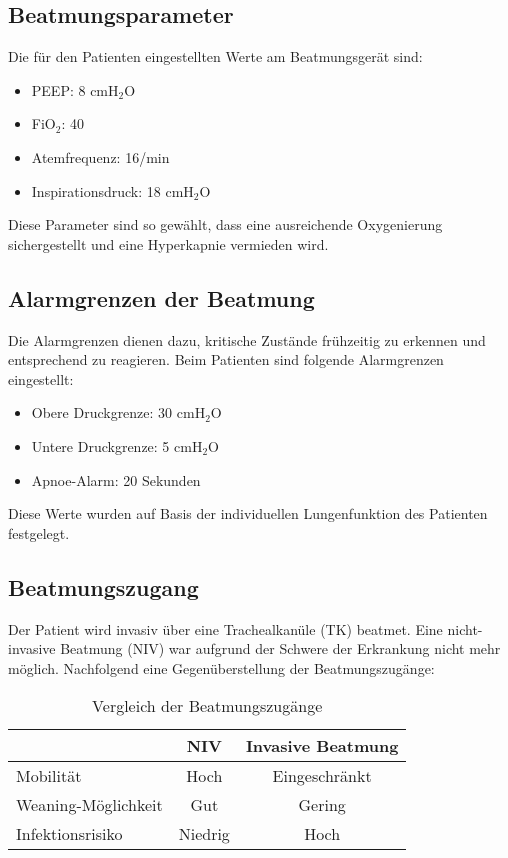 \documentclass[a4paper,12pt]{article}
\begin{document}
\subsection{Beatmungsparameter}
Die für den Patienten eingestellten Werte am Beatmungsgerät sind:
\begin{itemize}
	\item PEEP: 8 cmH$_2$O
	\item FiO$_2$: 40%
	\item Atemfrequenz: 16/min
	\item Inspirationsdruck: 18 cmH$_2$O
\end{itemize}
Diese Parameter sind so gewählt, dass eine ausreichende Oxygenierung sichergestellt
und eine Hyperkapnie vermieden wird.

\subsection{Alarmgrenzen der Beatmung}
Die Alarmgrenzen dienen dazu, kritische Zustände frühzeitig zu erkennen und
entsprechend zu reagieren. Beim Patienten sind folgende Alarmgrenzen eingestellt:
\begin{itemize}
	\item Obere Druckgrenze: 30 cmH$_2$O
	\item Untere Druckgrenze: 5 cmH$_2$O
	\item Apnoe-Alarm: 20 Sekunden
\end{itemize}
Diese Werte wurden auf Basis der individuellen Lungenfunktion des Patienten festgelegt.

\subsection{Beatmungszugang}
Der Patient wird invasiv über eine Trachealkanüle (TK) beatmet. Eine nicht-invasive
Beatmung (NIV) war aufgrund der Schwere der Erkrankung nicht mehr möglich. Nachfolgend
eine Gegenüberstellung der Beatmungszugänge:

\begin{table}[h]
	\centering
	\begin{tabular}{|l|c|c|}
		\hline
		                    & NIV     & Invasive Beatmung \\
		\hline
		Mobilität           & Hoch    & Eingeschränkt     \\
		Weaning-Möglichkeit & Gut     & Gering            \\
		Infektionsrisiko    & Niedrig & Hoch              \\
		\hline
	\end{tabular}
	\caption{Vergleich der Beatmungszugänge}
\end{table}
\end{document}
